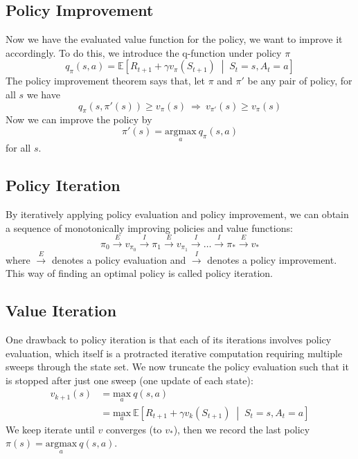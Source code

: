 \documentclass[balance,upint,subscriptcorrection,varvw,mathalfa=cal=boondoxo,pdf-a,colorlinks,nofoot]{asmeconf}
\begin{document}
\subsection{Policy Improvement}
\noindent Now we have the evaluated value function for the policy, we want to 
improve it accordingly. To do this, we introduce the q-function under 
policy \(\pi\)
\[q_\pi(s, a) = \mathbb{E}\left[R_{t+1} + \gamma v_\pi(S_{t+1})\;\middle|\;
S_t=s, A_t=a\right]\]
The policy improvement theorem says that, let \(\pi\) and \(\pi'\) be any pair
of policy, for all \(s\) we have
\[q_\pi(s, \pi'(s))\geq v_\pi(s) \:\Rightarrow\: v_{\pi'}(s) \geq v_\pi(s)\]
Now we can improve the policy by
\[\pi'(s)=\underset{a}{\text{argmax}}\:q_\pi(s,a)\]
for all \(s\).

\subsection{Policy Iteration}
\noindent By iteratively applying policy evaluation and policy improvement, we
can obtain a sequence of monotonically improving policies and value functions:
\[\pi_0 \overset{E}{\longrightarrow} v_{\pi_0} \overset{I}{\longrightarrow}
\pi_1 \overset{E}{\longrightarrow} v_{\pi_1} \overset{I}{\longrightarrow}
\dots \overset{I}{\longrightarrow} \pi_* \overset{E}{\longrightarrow} v_*\]
where \(\overset{E}{\longrightarrow}\) denotes a policy evaluation and
\(\overset{I}{\longrightarrow}\) denotes a policy improvement. This way of 
finding an optimal policy is called policy iteration.

\subsection{Value Iteration}
\noindent One drawback to policy iteration is that each of its iterations 
involves policy evaluation, which itself is a protracted iterative computation
requiring multiple sweeps through the state set.
\vspace{3mm}\newline We now truncate the policy evaluation such that it is
stopped after just one sweep (one update of each state):
\begin{align*}
    v_{k+1}(s)&=\underset{a}{\text{max}}\:q(s, a)\\
              &=\underset{a}{\text{max}}\:\mathbb{E}\left[
          R_{t+1}+\gamma v_k(S_{t+1})\;\middle|\;S_t=s, A_t=a\right]
\end{align*}
We keep iterate until \(v\) converges (to \(v_*\)), then we record the last
policy \(\pi(s) = \underset{a}{\text{argmax}}\:q(s, a)\).
\end{document}
